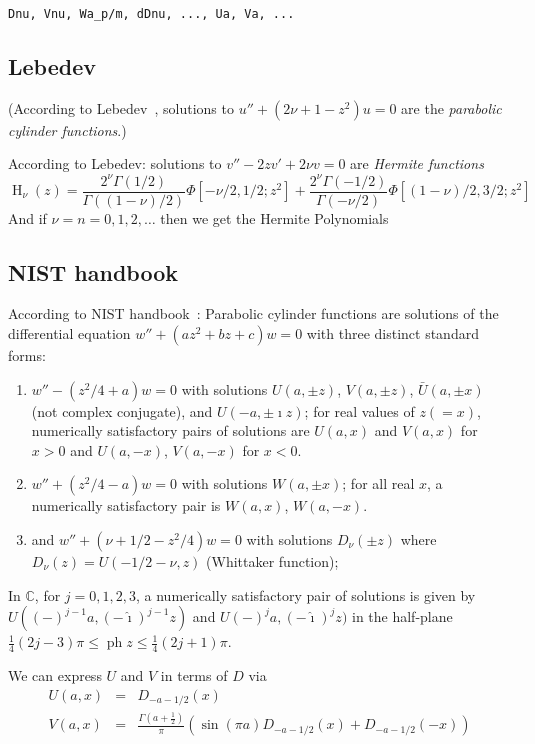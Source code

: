\documentclass[10pt,dvipdfmx,letterpaper,twoside]{article}
\let\O=\operatorname
\newcommand{\CC}{{\mathbb{C}}}
\newcommand{\ii}{{\hat{\imath}}}
\let\Gam=\Gamma
\begin{document}
{\tt Dnu, Vnu, Wa\_p/m, dDnu, ..., Ua, Va, ...}

\subsection{Lebedev}
(According to Lebedev~\cite{lebedev}, solutions to $u'' + (2\nu + 1 - z^2)u = 0$ are the {\em parabolic cylinder functions}.)

According to Lebedev: solutions to $v'' - 2zv' + 2\nu v=0$ are {\em Hermite functions}
\[ \O{H}_\nu(z) = \frac{2^\nu \Gam(1/2)}{\Gam((1-\nu)/2)} \Phi[-\nu/2, 1/2; z^2]
  + \frac{2^\nu \Gam(-1/2)}{\Gam(-\nu/2)} \Phi[(1-\nu)/2, 3/2; z^2] \]
And if $\nu=n=0,1,2,\dots$ then we get the Hermite Polynomials

\subsection{NIST handbook}
According to NIST handbook~\cite{nist}:
Parabolic cylinder functions are solutions of the differential equation $w'' + (az^2+bz+c)w = 0$
with three distinct standard forms:
\begin{enumerate}
\item $w''-(z^2/4 + a)w=0$ with solutions $U(a,\pm z)$, $V(a,\pm z)$, $\bar{U}(a,\pm x)$ (not complex conjugate), and $U(-a,\pm\ii z)$;
  for real values of $z(=x)$, numerically satisfactory pairs of solutions are $U(a,x)$ and $V(a,x)$ for $x>0$ and
  $U(a,-x)$, $V(a,-x)$ for $x<0$.
\item $w''+(z^2/4-a)w=0$ with solutions $W(a,\pm x)$;
  for all real $x$, a numerically satisfactory pair is $W(a,x)$, $W(a,-x)$.
\item and $w''+(\nu+1/2-z^2/4)w=0$ with solutions $D_\nu(\pm z)$ where $D_\nu(z)=U(-1/2-\nu,z)$ (Whittaker function);
\end{enumerate}
In $\CC$, for $j=0,1,2,3$, a numerically satisfactory pair of solutions is given by
$U((-)^{j-1}a,(-\ii)^{j-1}z)$ and $U(-)^ja,(-\ii)^jz)$ in the half-plane $\tfrac14(2j-3)\pi\leq\O{ph}z\leq\tfrac14(2j+1)\pi$.

We can express $U$ and $V$ in terms of $D$ via
\begin{eqnarray*}
U(a,x) &=& D_{-a-1/2}(x) \\
V(a,x) &=& \frac{\Gam(a+\tfrac12)}{\pi}\left(\sin(\pi a) D_{-a-1/2}(x) + D_{-a-1/2}(-x)\right)
\end{eqnarray*}
\end{document}
